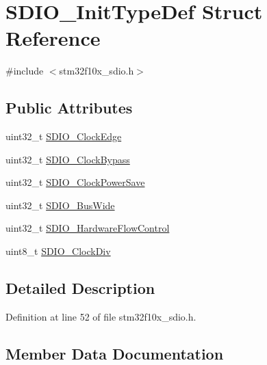 \hypertarget{struct_s_d_i_o___init_type_def}{}\section{S\+D\+I\+O\+\_\+\+Init\+Type\+Def Struct Reference}
\label{struct_s_d_i_o___init_type_def}


{\ttfamily \#include $<$stm32f10x\+\_\+sdio.\+h$>$}

\subsection*{Public Attributes}
\begin{DoxyCompactItemize}
\item 
uint32\+\_\+t \hyperlink{struct_s_d_i_o___init_type_def_a3252c846b68988b8ae70ca0d40030a52}{S\+D\+I\+O\+\_\+\+Clock\+Edge}
\item 
uint32\+\_\+t \hyperlink{struct_s_d_i_o___init_type_def_a6a06a65a5630b21da261f46125cb20b1}{S\+D\+I\+O\+\_\+\+Clock\+Bypass}
\item 
uint32\+\_\+t \hyperlink{struct_s_d_i_o___init_type_def_ac236cc5a376a65b9de64a31dab816364}{S\+D\+I\+O\+\_\+\+Clock\+Power\+Save}
\item 
uint32\+\_\+t \hyperlink{struct_s_d_i_o___init_type_def_a0540529f615c2b29933b442bc326f0a7}{S\+D\+I\+O\+\_\+\+Bus\+Wide}
\item 
uint32\+\_\+t \hyperlink{struct_s_d_i_o___init_type_def_a5f57f8aca913de9aed47ef708c05f34f}{S\+D\+I\+O\+\_\+\+Hardware\+Flow\+Control}
\item 
uint8\+\_\+t \hyperlink{struct_s_d_i_o___init_type_def_a4166ee534e6cf8ac2c6a6a03bec45b06}{S\+D\+I\+O\+\_\+\+Clock\+Div}
\end{DoxyCompactItemize}


\subsection{Detailed Description}


Definition at line 52 of file stm32f10x\+\_\+sdio.\+h.



\subsection{Member Data Documentation}
\mbox{\label{struct_s_d_i_o___init_type_def_a0540529f615c2b29933b442bc326f0a7}} 
